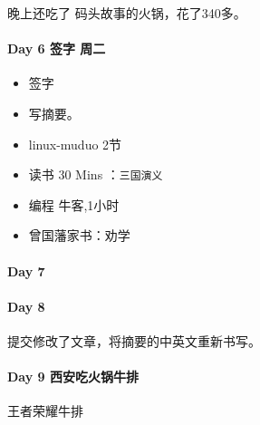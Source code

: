 \documentclass[UTF8,a4paper,8pt]{ctexart}
\begin{document}
	 	 晚上还吃了 码头故事的火锅，花了340多。
	 	 
 	 \paragraph{Day 6   签字	周二    \quad     }
	 	  \begin{itemize}[itemindent = 1em]
	 	  	\renewcommand\labelitemi{\makebox[0pt][l]{$\square$}\raisebox{.15ex}{\hspace{0.1em}$\checkmark$}}		
	 	  	
	 	  	\item    签字
	 	  	\item    写摘要。
	 	  	\item    linux-muduo 2节
	 	  	
	 	  	
	 	  	\renewcommand\labelitemi{\makebox[0pt][l]{$\square$}\hspace{1em}}
	 	  	\item   读书  30 Mins	：\verb|三国演义|
	 	  	\item   编程  牛客,1小时
	 	  	\item   曾国藩家书：劝学
	 	  \end{itemize}
 	 \paragraph{Day 7       \quad     }
 	 
 	 \paragraph{Day 8       \quad     }
	 	 提交修改了文章，将摘要的中英文重新书写。
 	 
 	 \paragraph{Day 9   西安吃火锅牛排    \quad     }
	 	 王者荣耀牛排
	 	 
\end{document}

